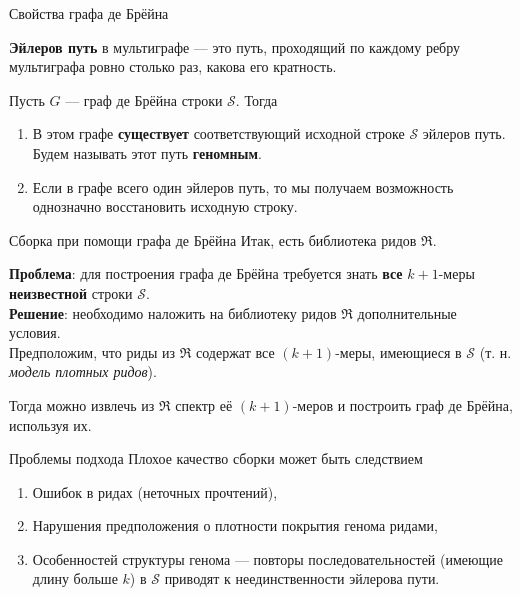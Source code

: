 \documentclass[unicode, notheorems]{beamer}
\begin{document}
\begin{frame}{Свойства графа де Брёйна}
	\begin{block}{}
		\textbf{Эйлеров путь} в мультиграфе --- это путь, проходящий по каждому ребру мультиграфа ровно столько раз, какова его кратность.
	\end{block}
	\vspace{0.2cm}
	Пусть $G$ --- граф де Брёйна строки $\mathcal{S}$. Тогда
	\begin{enumerate}
		\item В этом графе \textbf{существует} соответствующий исходной строке $\mathcal{S}$ эйлеров путь. Будем называть этот путь \textbf{геномным}.
		\item Если в графе всего один эйлеров путь, то мы получаем возможность однозначно восстановить исходную строку.
	\end{enumerate}
\end{frame}

\begin{frame}{Сборка при помощи графа де Брёйна}
	Итак, есть библиотека ридов $\mathfrak{R}$.\\
	\vspace{0.2cm}

	\textbf{Проблема}: для построения графа де Брёйна требуется знать \textbf{все} $k+1$-меры \textbf{неизвестной} строки $\mathcal{S}$.\\
	\vspace{0.4cm}
	\textbf{Решение}: необходимо наложить на библиотеку ридов $\mathfrak{R}$ дополнительные условия.\\
	\vspace{0.3cm}
	Предположим, что риды из $\mathfrak{R}$ содержат все $(k+1)$-меры, имеющиеся в $\mathcal{S}$ (т. н. \textit{модель плотных ридов}).\\
	\vspace{0.1cm}
	
	Тогда можно извлечь из $\mathfrak{R}$ спектр её $(k+1)$-меров и построить граф де Брёйна, используя их.
\end{frame}

\begin{frame}{Проблемы подхода}
	Плохое качество сборки может быть следствием
	\begin{enumerate}
		\item Ошибок в ридах (неточных прочтений),
		\item Нарушения предположения о плотности покрытия генома ридами,
		\item Особенностей структуры генома --- повторы последовательностей (имеющие длину больше $k$) в $\mathcal{S}$ приводят к неединственности эйлерова пути.
	\end{enumerate}
\end{frame}
\end{document}
